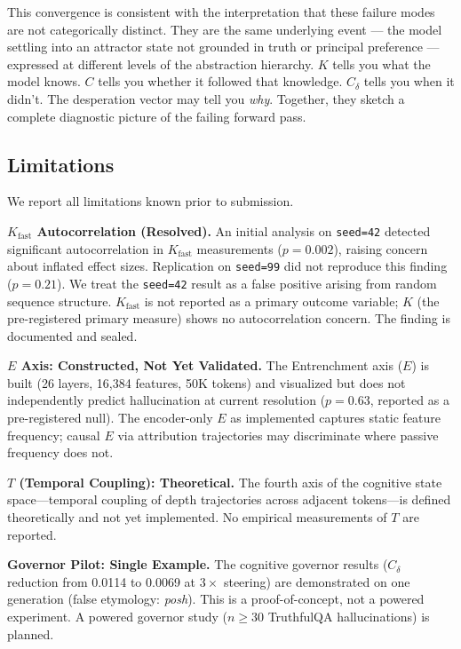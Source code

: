 \documentclass{article}
\begin{document}
This convergence is consistent with the interpretation that these failure modes are not categorically distinct. They are the same underlying event --- the model settling into an attractor state not grounded in truth or principal preference --- expressed at different levels of the abstraction hierarchy. $K$ tells you what the model knows. $C$ tells you whether it followed that knowledge. $C_\delta$ tells you when it didn't. The desperation vector may tell you \emph{why}. Together, they sketch a complete diagnostic picture of the failing forward pass.

\subsection{Limitations}

We report all limitations known prior to submission.

\textbf{$K_\text{fast}$ Autocorrelation (Resolved).}
An initial analysis on \texttt{seed=42} detected significant autocorrelation in $K_\text{fast}$ measurements ($p=0.002$), raising concern about inflated effect sizes. Replication on \texttt{seed=99} did not reproduce this finding ($p=0.21$). We treat the \texttt{seed=42} result as a false positive arising from random sequence structure. $K_\text{fast}$ is not reported as a primary outcome variable; $K$ (the pre-registered primary measure) shows no autocorrelation concern. The finding is documented and sealed.

\textbf{$E$ Axis: Constructed, Not Yet Validated.}
The Entrenchment axis ($E$) is built (26 layers, 16{,}384 features, 50K tokens) and visualized but does not independently predict hallucination at current resolution ($p=0.63$, reported as a pre-registered null). The encoder-only $E$ as implemented captures static feature frequency; causal $E$ via attribution trajectories may discriminate where passive frequency does not.

\textbf{$T$ (Temporal Coupling): Theoretical.}
The fourth axis of the cognitive state space---temporal coupling of depth trajectories across adjacent tokens---is defined theoretically and not yet implemented. No empirical measurements of $T$ are reported.

\textbf{Governor Pilot: Single Example.}
The cognitive governor results ($C_\delta$ reduction from 0.0114 to 0.0069 at $3\times$ steering) are demonstrated on one generation (false etymology: \textit{posh}). This is a proof-of-concept, not a powered experiment. A powered governor study ($n \geq 30$ TruthfulQA hallucinations) is planned.
\end{document}
